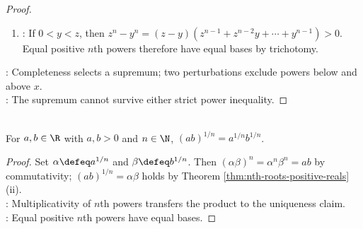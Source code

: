 \begin{theorem}
\begin{proof}
\begin{enumerate}[label=(\roman*)]
\begin{enumerate}[label=(\alph*)]
The inequality $(y-k)^n\geq x$ makes $y-k$ an upper bound of $E$ by monotonicity of positive integer powers.\\
This contradicts $y=\sup E$. Hence $y^n=x$ by trichotomy.
\end{enumerate}
\item {}: If $0<y<z$, then $z^n-y^n=(z-y)(z^{n-1}+z^{n-2}y+\cdots+y^{n-1})>0$.\\
Equal positive $n$th powers therefore have equal bases by trichotomy.
\end{enumerate}
: Completeness selects a supremum; two perturbations exclude powers below and above $x$.\\
: The supremum cannot survive either strict power inequality.
\end{proof}
\end{theorem}

\begin{corollary} \label{cor:nth-root-product-positive-reals} \\
For $a,b\in\R$ with $a,b>0$ and $n\in\N$, $(ab)^{1/n}=a^{1/n}b^{1/n}$.
\begin{proof}
Set $\alpha\defeq a^{1/n}$ and $\beta\defeq b^{1/n}$. Then $(\alpha\beta)^n=\alpha^n\beta^n=ab$ by commutativity; $(ab)^{1/n}=\alpha\beta$ holds by Theorem \ref{thm:nth-roots-positive-reals}(ii).\\
: Multiplicativity of $n$th powers transfers the product to the uniqueness claim.\\
: Equal positive $n$th powers have equal bases.
\end{proof}
\end{corollary}

